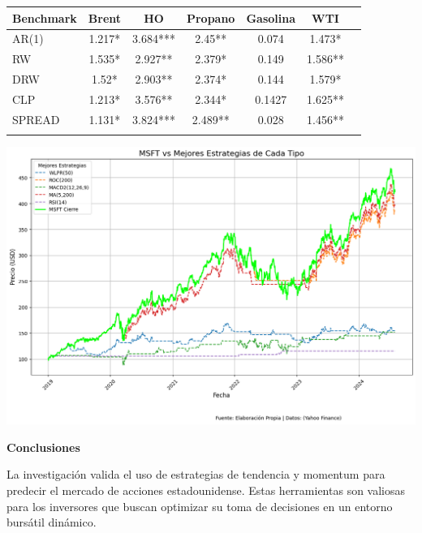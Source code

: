 \documentclass[a0,portrait]{a0poster}
\newcommand{\customsection}[1]{
    \begin{center}
        \begin{tcolorbox}[colframe=miRojo!50, colback=miRojo!30, width=\linewidth, boxrule=1mm, arc=3mm, auto outer arc]
            \begin{center}
            \vspace{.5cm} %
            \color{black}
            \textbf{\Huge #1}
            \color{miRojo}
            \vspace{.5cm} %
            \end{center}
        \end{tcolorbox}
    \end{center}
}
\begin{document}
\begin{multicols}{2}
    \vspace{1cm}
    \begin{minipage}{.984\linewidth}
    \centering
    \begin{tabular}{lcccccc}
        \toprule
        \textbf{Benchmark} & \textbf{Brent} & \textbf{HO} & \textbf{Propano} & \textbf{Gasolina} & \textbf{WTI} \\
        \midrule
        AR(1)     & 1.217*  & 3.684*** & 2.45** & 0.074  & 1.473*  \\
        RW        & 1.535*  & 2.927**  & 2.379* & 0.149  & 1.586** \\
        DRW       & 1.52*   & 2.903**  & 2.374* & 0.144  & 1.579*  \\
        CLP       & 1.213*  & 3.576**  & 2.344* & 0.1427 & 1.625** \\
        SPREAD    & 1.131*  & 3.824*** & 2.489** & 0.028  & 1.456** \\
        \bottomrule
        \vspace{.5cm}
    \end{tabular}
    \end{minipage}
    \begin{minipage}{\linewidth}
    \centering
    \includegraphics[width=0.9\linewidth]{grafico_mejores_estrategias_MSFT.png}
    \end{minipage}
    \customsection{Conclusiones}
    \par
    \indent La investigación valida el uso de estrategias de tendencia y momentum para predecir el mercado de acciones estadounidense. Estas herramientas son valiosas para los inversores que buscan optimizar su toma de decisiones en un entorno bursátil dinámico. 

\end{multicols}
\end{document}
